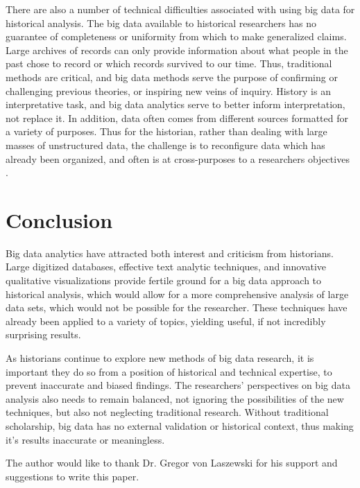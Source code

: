 \documentclass[sigconf]{acmart}
\begin{document}
There are also a number of technical difficulties associated with using big data for historical analysis. The big data available to historical researchers has no guarantee of completeness or uniformity from which to make generalized claims. Large archives of records can only provide information about what people in the past chose to record or which records survived to our time. Thus, traditional methods are critical, and big data methods serve the purpose of confirming or challenging previous theories, or inspiring new veins of inquiry. History is an interpretative task, and big data analytics serve to better inform interpretation, not replace it. In addition, data often comes from different sources formatted for a variety of purposes. Thus for the historian, rather than dealing with large masses of unstructured data, the challenge is to reconfigure data which has already been organized, and often is at cross-purposes to a researchers objectives \cite{digitalrepublicletters}.

\section{Conclusion}

Big data analytics have attracted both interest and criticism from historians. Large digitized databases, effective text analytic techniques, and innovative qualitative visualizations provide fertile ground for a big data approach to historical analysis, which would allow for a more comprehensive analysis of large data sets, which would not be possible for the researcher. These techniques have already been applied to a variety of topics, yielding useful, if not incredibly surprising results. 

As historians continue to explore new methods of big data research, it is important they do so from a position of historical and technical expertise, to prevent inaccurate and biased findings. The researchers' perspectives on big data analysis also needs to remain balanced, not ignoring the possibilities of the new techniques, but also not neglecting traditional research. Without traditional scholarship, big data has no external validation or historical context, thus making it's results inaccurate or meaningless.

\begin{acks}

  The author would like to thank Dr. Gregor von Laszewski for his
  support and suggestions to write this paper.

\end{acks}


 


\end{document}
